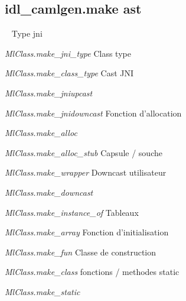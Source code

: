 \documentclass[a4paper, 11pt, notitlepage]{article}
\begin{document}
\subsection*{idl\_camlgen.make ast}
\ 
\newline
Type jni

\emph{MlClass.make\_jni\_type}
\newline
Class type

\emph{MlClass.make\_class\_type}
\newline
Cast JNI

\emph{MlClass.make\_jniupcast}

\emph{MlClass.make\_jnidowncast}
\newline
Fonction d'allocation

\emph{MlClass.make\_alloc}

\emph{MlClass.make\_alloc\_stub}
\newline
Capsule / souche

\emph{MlClass.make\_wrapper}
\newline
Downcast utilisateur

\emph{MlClass.make\_downcast}

\emph{MlClass.make\_instance\_of}
\newline
Tableaux

\emph{MlClass.make\_array}
\newline
Fonction d'initialisation

\emph{MlClass.make\_fun}
\newline
Classe de construction

\emph{MlClass.make\_class}
\newline
fonctions / methodes static

\emph{MlClass.make\_static}
\end{document}
